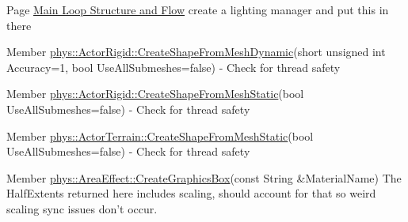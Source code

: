 \label{todo__todo000034}
\hypertarget{todo__todo000034}{}
 
\begin{DoxyDescription}
\item[Page \hyperlink{mainloop1}{Main Loop Structure and Flow} ]create a lighting manager and put this in there 
\end{DoxyDescription}

\label{todo__todo000001}
\hypertarget{todo__todo000001}{}
 
\begin{DoxyDescription}
\item[Member \hyperlink{classphys_1_1ActorRigid_a78f2f2dfc8b35f13e9a7680189bbdd48}{phys::ActorRigid::CreateShapeFromMeshDynamic}(short unsigned int Accuracy=1, bool UseAllSubmeshes=false) ]-\/ Check for thread safety 
\end{DoxyDescription}

\label{todo__todo000002}
\hypertarget{todo__todo000002}{}
 
\begin{DoxyDescription}
\item[Member \hyperlink{classphys_1_1ActorRigid_a5adfa6199955f9c0de4e0af54aeb96f6}{phys::ActorRigid::CreateShapeFromMeshStatic}(bool UseAllSubmeshes=false) ]-\/ Check for thread safety 
\end{DoxyDescription}

\label{todo__todo000003}
\hypertarget{todo__todo000003}{}
 
\begin{DoxyDescription}
\item[Member \hyperlink{classphys_1_1ActorTerrain_aaed245d7af66230aaabb02a84e891bb0}{phys::ActorTerrain::CreateShapeFromMeshStatic}(bool UseAllSubmeshes=false) ]-\/ Check for thread safety 
\end{DoxyDescription}

\label{todo__todo000004}
\hypertarget{todo__todo000004}{}
 
\begin{DoxyDescription}
\item[Member \hyperlink{classphys_1_1AreaEffect_a169a8cba1c9aec84573788dff001fb31}{phys::AreaEffect::CreateGraphicsBox}(const String \&MaterialName) ]The HalfExtents returned here includes scaling, should account for that so weird scaling sync issues don't occur. 
\end{DoxyDescription}

\label{todo__todo000006}
\hypertarget{todo__todo000006}{}
 
